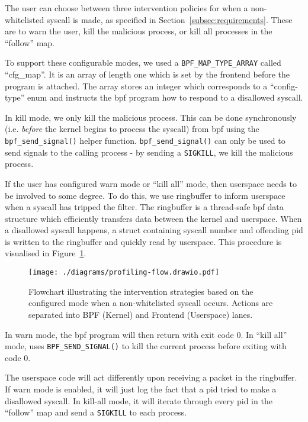 The user can choose between three intervention policies for when a
non-whitelisted syscall is made, as specified in 
Section~\ref{subsec:requirements}. These are to warn the user, kill the
malicious process, or kill all processes in the ``follow'' map.

To support these configurable modes, we used a \texttt{BPF\_MAP\_TYPE\_ARRAY}
called ``cfg\_map''. It is an array of length one which is set by the frontend
before the program is attached. The array stores an integer which corresponds to
a ``config-type'' enum and instructs the \ac{bpf} program how to respond to a
disallowed syscall.

In kill mode, we only kill the malicious process. This can be done synchronously
(i.e. \textit{before} the kernel begins to process the syscall) from \ac{bpf}
using the \texttt{bpf\_send\_signal()} helper function. 
\texttt{bpf\_send\_signal()} can only be used to send signals to the calling
process - by sending a \texttt{SIGKILL}, we kill the malicious process.

If the user has configured warn mode or ``kill all'' mode, then userspace needs
to be involved to some degree. To do this, we use  ringbuffer to inform
userspace when a syscall has tripped the filter. The ringbuffer is a thread-safe
\ac{bpf} data structure which efficiently transfers data between the kernel and
userspace. When a disallowed syscall happens, a struct containing syscall
number and offending \ac{pid} is written to the ringbuffer and quickly read by
userspace. This procedure is visualised in Figure~\ref{fig:intervention-flowchart}.

\begin{figure}[h]
\centering
\texttt{[image: ./diagrams/profiling-flow.drawio.pdf]} 
\caption{Flowchart illustrating the intervention strategies based on the configured mode when a non-whitelisted syscall occurs. Actions are separated into BPF (Kernel) and Frontend (Userspace) lanes.}
\label{fig:intervention-flowchart}
\end{figure}

In warn mode, the \ac{bpf} program will then return with exit code 0. In ``kill
all'' mode, \af uses \texttt{BPF\_SEND\_SIGNAL()} to kill the current process
before exiting with code 0.

The userspace code will act differently upon receiving a packet in the
ringbuffer. If warn mode is enabled, it will just log the fact that a \ac{pid}
tried to make a disallowed syscall. In kill-all mode, it will iterate through
every \ac{pid} in the ``follow'' map and send a \texttt{SIGKILL} to each
process.

